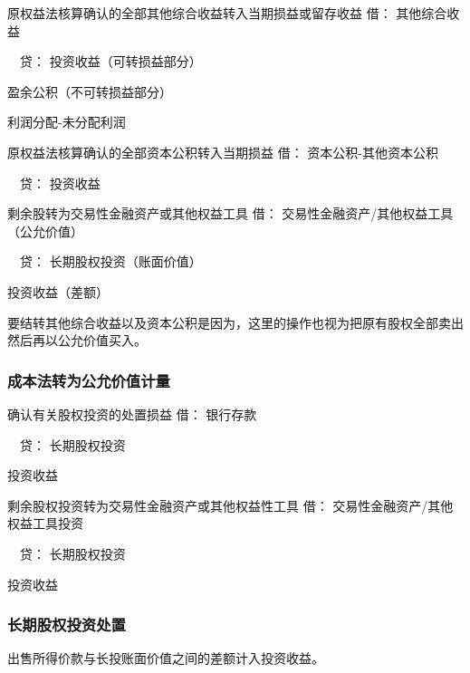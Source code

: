 \documentclass[UTF8,12pt]{ctexart}
\newenvironment{Dr}{\noindent 借：}{\par}
\newenvironment{Cr}{\noindent \ \ 贷：}{\par}
\numberwithin{equation}{section} %
\numberwithin{figure}{section}
\numberwithin{table}{section}
\begin{document}
	原权益法核算确认的全部其他综合收益转入当期损益或留存收益
	\begin{Dr}
		其他综合收益
	\end{Dr}
	\begin{Cr}
		投资收益（可转损益部分）
		
		盈余公积（不可转损益部分）
		
		利润分配-未分配利润
	\end{Cr}
	
	原权益法核算确认的全部资本公积转入当期损益
	\begin{Dr}
		资本公积-其他资本公积
	\end{Dr}
	\begin{Cr}
		投资收益
	\end{Cr}
	
	剩余股转为交易性金融资产或其他权益工具
	\begin{Dr}
		交易性金融资产/其他权益工具（公允价值）
	\end{Dr}
	\begin{Cr}
		长期股权投资（账面价值）
		
		投资收益（差额）
	\end{Cr}
	
	要结转其他综合收益以及资本公积是因为，这里的操作也视为把原有股权全部卖出然后再以公允价值买入。
	
	\subsubsection{成本法转为公允价值计量}
	确认有关股权投资的处置损益
	\begin{Dr}
		银行存款
	\end{Dr}
	\begin{Cr}
		长期股权投资
		
		投资收益
	\end{Cr}
	
	剩余股权投资转为交易性金融资产或其他权益性工具
	\begin{Dr}
		交易性金融资产/其他权益工具投资
	\end{Dr}
	\begin{Cr}
		长期股权投资
		
		投资收益
	\end{Cr}
	
	
	
	\subsubsection{长期股权投资处置}
	出售所得价款与长投账面价值之间的差额计入投资收益。
	
\end{document}
